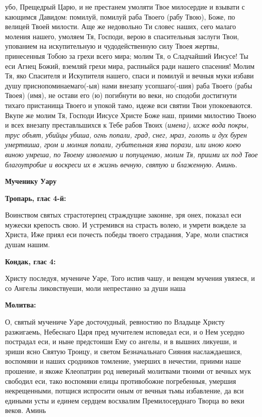 убо, Прещедрый Царю, и не престанем умоляти Твое милосердие и взывати с кающимся Давидом: помилуй, помилуй раба Твоего (рабу Твою), Боже, по велицей Твоей милости. Аще же недовольно Ти словес наших, сего малаго моления нашего, умоляем Тя, Господи, верою в спасительныя заслуги Твои, упованием на искупительную и чудодейственную силу Твоея жертвы, принесенныя Тобою за грехи всего мира; молим Тя, о Сладчайший Иисусе! Ты еси Агнец Божий, вземляй грехи мира, распныйся ради нашего спасения! Молим Тя, яко Спасителя и Искупителя нашего, спаси и помилуй и вечныя муки избави душу приснопоминаемаго(-ыя) нами внезапу усопшаго(-шия) раба Твоего (рабы Твоея) (имя), не остави его (ю) погибнути во веки, но сподоби достигнути тихаго пристанища Твоего и упокой тамо, идеже вси святии Твои упокоеваются. Вкупе же молим Тя, Господи Иисусе Христе Боже наш, приими милостию Твоею и всех внезапу преставльшихся к Тебе рабов Твоих (\itshape имена\normalfont{}), ихже вода покры, трус объят, убийцы убиша, огнь попали, град, снег, мраз, голоть и дух бурен умертвиша, гром и молния попали, губительная язва порази, или иною коею виною умреша, по Твоему изволению и попущению, молим Тя, приими их под Твое благоутробие и воскреси их в жизнь вечную, святую и блаженную. Аминь.


\mychapterending




\medskip


\bfseries Мученику Уару\normalfont{}


\bfseries Тропарь, глас 4-й:\normalfont{}


Воинством святых страстотерпец страждущие законне, зря онех, показал еси мужески крепость свою. И устремився на страсть волею, и умрети вожделе за Христа, Иже приял еси почесть победы твоего страдания, Уаре, моли спастися душам нашим.


\medskip


\bfseries Кондак, глас 4:\normalfont{}


Христу последуя, мучениче Уаре, Того испив чашу, и венцем мучения увязеся, и со Ангелы ликовствуеши, моли непрестанно за души наша


\medskip


\bfseries Молитва:\normalfont{}


О, святый мучениче Уаре досточудный, ревностию по Владыце Христу разжигаемь, Небеснаго Царя пред мучителем исповедал еси, и о Нем усердно пострадал еси, и ныне предстоиши Ему со ангелы, и в вышних ликуеши, и зриши ясно Святую Троицу, и светом Безначальнаго Сияния наслаждаешися, воспомяни и наших сродников томление, умерших в нечестии, приими наше прошение, и якоже Клеопатрин род неверный молитвами твоими от вечных мук свободил еси, тако воспомяни елицы противобожне погребенныя, умершия некрещенными, потщися испросити оным от вечныя тьмы избавление, да вси едиными усты и единем сердцем восхвалим Премилосерднаго Творца во веки веков. Аминь


